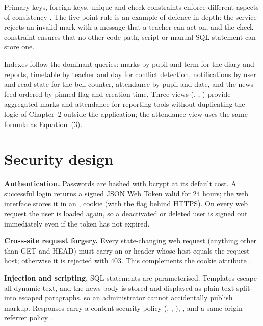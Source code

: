 Primary keys, foreign keys, unique and check constraints enforce different aspects of consistency \cite{pgconstraints}. The five-point rule is an example of defence in depth: the service rejects an invalid mark with a message that a teacher can act on, and the check constraint ensures that no other code path, script or manual SQL statement can store one.

Indexes follow the dominant queries: marks by pupil and term for the diary and reports, timetable by teacher and day for conflict detection, notifications by user and read state for the bell counter, attendance by pupil and date, and the news feed ordered by pinned flag and creation time. Three views (, , ) provide aggregated marks and attendance for reporting tools without duplicating the logic of Chapter~2 outside the application; the attendance view uses the same formula as Equation~(3).

\section{Security design}

\textbf{Authentication.} Passwords are hashed with bcrypt at its default cost. A successful login returns a signed JSON Web Token valid for 24 hours; the web interface stores it in an ,  cookie (with the  flag behind HTTPS). On every web request the user is loaded again, so a deactivated or deleted user is signed out immediately even if the token has not expired.

\textbf{Cross-site request forgery.} Every state-changing web request (anything other than GET and HEAD) must carry an  or  header whose host equals the request host; otherwise it is rejected with 403. This complements the  cookie attribute \cite{owaspcsrf}.

\textbf{Injection and scripting.} SQL statements are parameterised. Templates escape all dynamic text, and the news body is stored and displayed as plain text split into escaped paragraphs, so an administrator cannot accidentally publish markup. Responses carry a content-security policy (, , ), ,  and a same-origin referrer policy \cite{mdncsp}.

